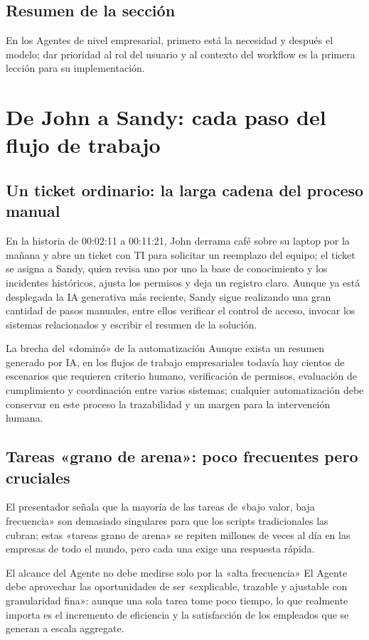 \documentclass[a4paper]{article}
\begin{document}
\subsection{Resumen de la sección}
En los Agentes de nivel empresarial, primero está la necesidad y después el modelo; dar prioridad al rol del usuario y al contexto del workflow es la primera lección para su implementación.

\section{De John a Sandy: cada paso del flujo de trabajo}
\subsection{Un ticket ordinario: la larga cadena del proceso manual}
En la historia de 00:02:11 a 00:11:21, John derrama café sobre su laptop por la mañana y abre un ticket con TI para solicitar un reemplazo del equipo; el ticket se asigna a Sandy, quien revisa uno por uno la base de conocimiento y los incidentes históricos, ajusta los permisos y deja un registro claro. Aunque ya está desplegada la IA generativa más reciente, Sandy sigue realizando una gran cantidad de pasos manuales, entre ellos verificar el control de acceso, invocar los sistemas relacionados y escribir el resumen de la solución.

\begin{warningbox}{La brecha del «dominó» de la automatización}
Aunque exista un resumen generado por IA, en los flujos de trabajo empresariales todavía hay cientos de escenarios que requieren criterio humano, verificación de permisos, evaluación de cumplimiento y coordinación entre varios sistemas; cualquier automatización debe conservar en este proceso la trazabilidad y un margen para la intervención humana.
\end{warningbox}

\subsection{Tareas «grano de arena»: poco frecuentes pero cruciales}
El presentador señala que la mayoría de las tareas de «bajo valor, baja frecuencia» son demasiado singulares para que los scripts tradicionales las cubran; estas «tareas grano de arena» se repiten millones de veces al día en las empresas de todo el mundo, pero cada una exige una respuesta rápida.

\begin{importantbox}{El alcance del Agente no debe medirse solo por la «alta frecuencia»
}
El Agente debe aprovechar las oportunidades de ser «explicable, trazable y ajustable con granularidad fina»: aunque una sola tarea tome poco tiempo, lo que realmente importa es el incremento de eficiencia y la satisfacción de los empleados que se generan a escala aggregate.
\end{importantbox}
\end{document}
